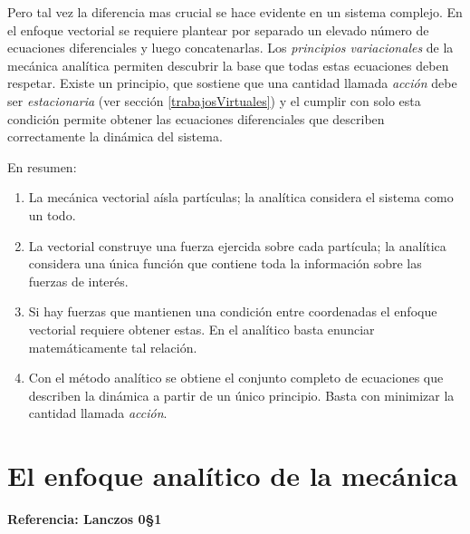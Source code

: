 \documentclass[12pt, spanish, a4paper, ]{article}
\begin{document}
Pero tal vez la diferencia mas crucial se hace evidente en un sistema complejo.
En el enfoque vectorial se requiere plantear por separado un elevado número de ecuaciones diferenciales y luego concatenarlas.
Los \emph{principios variacionales} de la mecánica analítica permiten descubrir la base que todas estas ecuaciones deben respetar.
Existe un principio, que sostiene que una cantidad llamada \emph{acción} debe ser \emph{estacionaria} (ver sección \ref{trabajosVirtuales}) y el cumplir con solo esta condición permite obtener las ecuaciones diferenciales que describen correctamente la dinámica del sistema.

En resumen:
\begin{enumerate}
	\item La mecánica vectorial aísla partículas; la analítica considera el sistema como un todo.
	\item La vectorial construye una fuerza ejercida sobre cada partícula; la analítica considera una única función que contiene toda la información sobre las fuerzas de interés.
	\item Si hay fuerzas que mantienen una condición entre coordenadas el enfoque vectorial requiere obtener estas. En el analítico basta enunciar matemáticamente tal relación.
	\item Con el método analítico se obtiene el conjunto completo de ecuaciones que describen la dinámica a partir de un único principio. Basta con minimizar la cantidad llamada \emph{acción}. 
\end{enumerate}




\section{El enfoque analítico de la mecánica }
\textbf{Referencia: Lanczos 0\S1}\\
\end{document}
